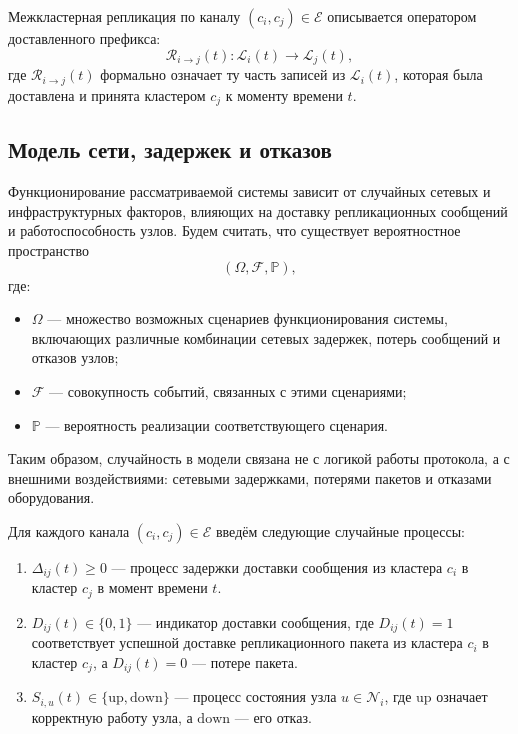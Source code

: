 Межкластерная репликация по каналу $(c_i,c_j)\in\mathcal{E}$
описывается оператором доставленного префикса:
\begin{equation}
\mathcal{R}_{i\to j}(t): \mathcal{L}_i(t) \to \mathcal{L}_j(t),
\label{eq:Rij_time}
\end{equation}
где $\mathcal{R}_{i\to j}(t)$ формально означает ту часть записей из $\mathcal{L}_i(t)$,
которая была доставлена и принята кластером $c_j$ к моменту времени $t$.

\subsection{Модель сети, задержек и отказов}

Функционирование рассматриваемой системы
зависит от случайных сетевых и инфраструктурных факторов,
влияющих на доставку репликационных сообщений
и работоспособность узлов.
Будем считать, что существует вероятностное пространство
\[
(\Omega,\mathcal{F},\mathbb{P}),
\]
где:

\begin{itemize}
\item $\Omega$ — множество возможных сценариев функционирования системы,
включающих различные комбинации сетевых задержек,
потерь сообщений и отказов узлов;
\item $\mathcal{F}$ — совокупность событий,
связанных с этими сценариями;
\item $\mathbb{P}$ — вероятность реализации соответствующего сценария.
\end{itemize}

Таким образом, случайность в модели связана
не с логикой работы протокола,
а с внешними воздействиями:
сетевыми задержками,
потерями пакетов и отказами оборудования.

Для каждого канала $(c_i,c_j)\in\mathcal{E}$ введём следующие случайные процессы:

\begin{enumerate}

\item
$\Delta_{ij}(t) \ge 0$
--- процесс задержки доставки сообщения
из кластера $c_i$ в кластер $c_j$ в момент времени $t$.

\item
$D_{ij}(t) \in \{0,1\}$
--- индикатор доставки сообщения,
где $D_{ij}(t)=1$ соответствует успешной доставке репликационного пакета
из кластера $c_i$ в кластер $c_j$, а $D_{ij}(t)=0$ --- потере пакета.

\item
$S_{i,u}(t) \in \{\mathrm{up}, \mathrm{down}\}$
--- процесс состояния узла $u \in \mathcal{N}_i$,
где $\mathrm{up}$ означает корректную работу узла,
а $\mathrm{down}$ --- его отказ.

\end{enumerate}

